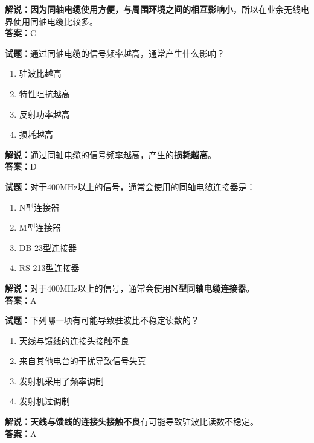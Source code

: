 \documentclass{ctexbook}
\begin{document}
\noindent\textbf{解说：}\textbf{因为同轴电缆使用方便，与周围环境之间的相互影响小}，所以在业余无线电界使用同轴电缆比较多。\\\noindent\textbf{答案：}C

\vspace{\baselineskip}

\noindent\textbf{试题：}通过同轴电缆的信号频率越高，通常产生什么影响？

\begin{enumerate}[leftmargin=3em]
  \item 驻波比越高
  \item 特性阻抗越高
  \item 反射功率越高
  \item 损耗越高
\end{enumerate}

\noindent\textbf{解说：}通过同轴电缆的信号频率越高，产生的\textbf{损耗越高}。\\\noindent\textbf{答案：}D

\vspace{\baselineskip}

\noindent\textbf{试题：}对于400\si{\MHz}以上的信号，通常会使用的同轴电缆连接器是：

\begin{enumerate}[leftmargin=3em]
  \item N型连接器
  \item M型连接器
  \item DB-23型连接器
  \item RS-213型连接器
\end{enumerate}

\noindent\textbf{解说：}对于400\si{\MHz}以上的信号，通常会使用\textbf{N型同轴电缆连接器}。\\\noindent\textbf{答案：}A

\vspace{\baselineskip}

\noindent\textbf{试题：}下列哪一项有可能导致驻波比不稳定读数的？

\begin{enumerate}[leftmargin=3em]
  \item 天线与馈线的连接头接触不良
  \item 来自其他电台的干扰导致信号失真
  \item 发射机采用了频率调制
  \item 发射机过调制
\end{enumerate}

\noindent\textbf{解说：}\textbf{天线与馈线的连接头接触不良}有可能导致驻波比读数不稳定。\\\noindent\textbf{答案：}A
\end{document}
